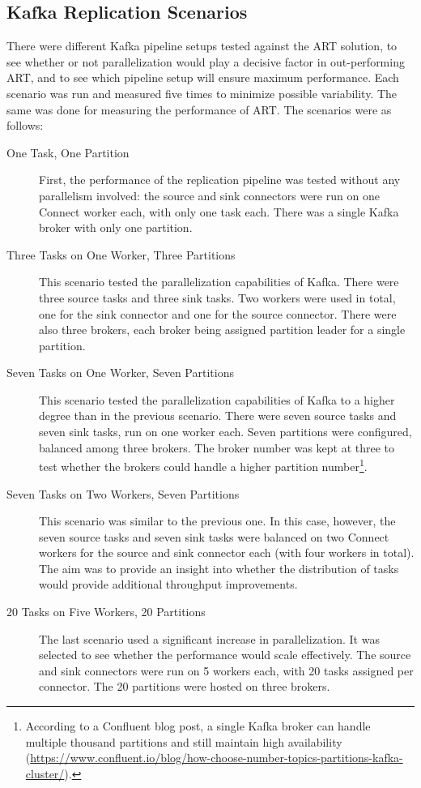 \subsection{Kafka Replication Scenarios}
\label{ch05:methodology:design:scenarios}
There were different Kafka pipeline setups tested against the \ac{ART} solution, to see whether or not parallelization would play a decisive factor in out-performing \ac{ART}, and to see which pipeline setup will ensure maximum performance. Each scenario was run and measured five times to minimize possible variability. The same was done for measuring the performance of \ac{ART}. The scenarios were as follows:
\begin{description}
    \item [One Task, One Partition]
    First, the performance of the replication pipeline was tested without any parallelism involved: the source and sink connectors were run on one Connect worker each, with only one task each. There was a single Kafka broker with only one partition.

    \item[Three Tasks on One Worker, Three Partitions]
    This scenario tested the parallelization capabilities of Kafka. There were three source tasks and three sink tasks. Two workers were used in total, one for the sink connector and one for the source connector. There were also three brokers, each broker being assigned partition leader for a single partition.

    \item[Seven Tasks on One Worker, Seven Partitions]
    This scenario tested the parallelization capabilities of Kafka to a higher degree than in the previous scenario. There were seven source tasks and seven sink tasks, run on one worker each. Seven partitions were configured, balanced among three brokers. The broker number was kept at three to test whether the brokers could handle a higher partition number\footnote{According to a Confluent blog post, a single Kafka broker can handle multiple thousand partitions and still maintain high availability (\url{https://www.confluent.io/blog/how-choose-number-topics-partitions-kafka-cluster/}).}.

    \item[Seven Tasks on Two Workers, Seven Partitions]
    This scenario was similar to the previous one. In this case, however, the seven source tasks and seven sink tasks were balanced on two Connect workers for the source and sink connector each (with four workers in total). The aim was to provide an insight into whether the distribution of tasks would provide additional throughput improvements.
    
    \item[20 Tasks on Five Workers, 20 Partitions] The last scenario used a significant increase in parallelization. It was selected to see whether the performance would scale effectively. The source and sink connectors were run on 5 workers each, with 20 tasks assigned per connector. The 20 partitions were hosted on three brokers.
    
\end{description}

